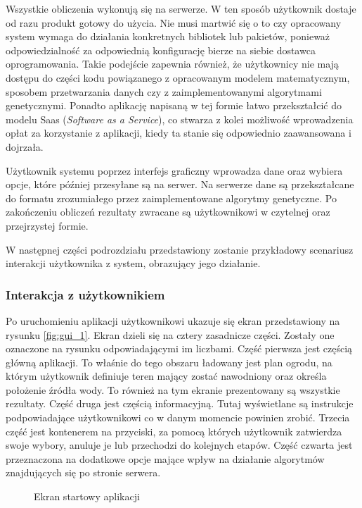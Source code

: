 \documentclass[twoside]{iisthesis}
\begin{document}
Wszystkie obliczenia wykonują się na serwerze. W ten sposób użytkownik dostaje od razu produkt gotowy do użycia. Nie musi martwić się o to czy opracowany system wymaga do działania konkretnych bibliotek lub pakietów, ponieważ odpowiedzialność za odpowiednią konfigurację bierze na siebie dostawca oprogramowania. Takie podejście zapewnia również, że użytkownicy nie mają dostępu do części kodu powiązanego z opracowanym modelem matematycznym, sposobem przetwarzania danych czy z zaimplementowanymi algorytmami genetycznymi. Ponadto aplikację napisaną w tej formie łatwo przekształcić do modelu Saas (\textit{Software as a Service}), co stwarza z kolei możliwość wprowadzenia opłat za korzystanie z aplikacji, kiedy ta stanie się odpowiednio zaawansowana i dojrzała.

Użytkownik systemu poprzez interfejs graficzny wprowadza dane oraz wybiera opcje, które później przesyłane są na serwer. Na serwerze dane są przekształcane do formatu zrozumiałego przez zaimplementowane algorytmy genetyczne. Po zakończeniu obliczeń rezultaty zwracane są użytkownikowi w czytelnej oraz przejrzystej formie.

W następnej części podrozdziału przedstawiony zostanie przykładowy scenariusz interakcji użytkownika z system, obrazujący jego działanie.

\subsubsection{Interakcja z użytkownikiem}
Po uruchomieniu aplikacji użytkownikowi ukazuje się ekran przedstawiony na rysunku \eqref{fig:gui_1}. Ekran dzieli się na cztery zasadnicze części. Zostały one oznaczone na rysunku odpowiadającymi im liczbami. Część pierwsza jest częścią główną aplikacji. To właśnie do tego obszaru ładowany jest plan ogrodu, na którym użytkownik definiuje teren mający zostać nawodniony oraz określa położenie źródła wody. To również na tym ekranie prezentowany są wszystkie rezultaty. Część druga jest częścią informacyjną. Tutaj wyświetlane są instrukcje podpowiadające użytkownikowi co w danym momencie powinien zrobić. Trzecia część jest kontenerem na przyciski, za pomocą których użytkownik zatwierdza swoje wybory, anuluje je lub przechodzi do kolejnych etapów. Część czwarta jest przeznaczona na dodatkowe opcje mające wpływ na działanie algorytmów znajdujących się po stronie serwera.
\begin{figure}[!htb]
	\centering
	\caption{Ekran startowy aplikacji}
	\label{fig:gui_1}
\end{figure}
\end{document}
